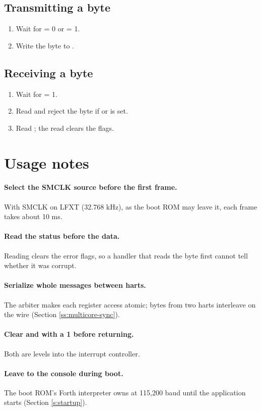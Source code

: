 \subsection{Transmitting a byte}

\begin{enumerate}
	\item Wait for  = 0 or  = 1.
	\item Write the byte to .
\end{enumerate}

\subsection{Receiving a byte}

\begin{enumerate}
	\item Wait for  = 1.
	\item Read  and reject the byte if  or  is set.
	\item Read ; the read clears the flags.
\end{enumerate}

\section{Usage notes}

\paragraph{Select the SMCLK source before the first frame.} With SMCLK on LFXT (32.768 kHz), as the boot ROM may leave it, each frame takes about 10 \si{\milli\second}.

\paragraph{Read the status before the data.} Reading  clears the error flags, so a handler that reads the byte first cannot tell whether it was corrupt.

\paragraph{Serialize whole messages between harts.} The arbiter makes each register access atomic; bytes from two harts interleave on the wire (Section \ref{ss:multicore-sync}).

\paragraph{Clear  and  with a 1 before returning.} Both are levels into the interrupt controller.

\paragraph{Leave  to the console during boot.} The boot ROM's Forth interpreter owns  at 115,200 baud until the application starts (Section \ref{s:startup}).
